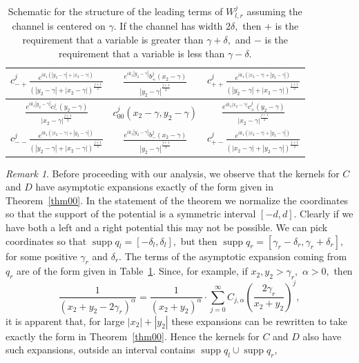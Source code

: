 \documentclass[11pt]{article}
\newcommand\supp{\operatorname{supp}}
\theoremstyle{definition}
\theoremstyle{remark}
\newtheorem{remark}{Remark}
\begin{document}
 \begin{table}[h]
   \begin{center}
  \begin{tabular}{c|c|c}
$c^j_{-+}\frac{e^{ik_1(|y_2-\gamma|+|x_2-\gamma|)}}{(|y_2-\gamma|+|x_2-\gamma|)^{\frac{j+1}{2}}}$ &
  $\frac{e^{ik_1|y_2-\gamma|}b^j_+(x_2-\gamma)}{|y_2-\gamma|^{\frac{j+1}{2}}}$ &
  $c^j_{++}\frac{e^{ik_1(|x_2-\gamma|+|y_2-\gamma|)}}{(|y_2-\gamma|+|x_2-\gamma|)^{\frac{j+1}{2}}}$\\
  \hline $\frac{e^{ik_1|y_2-\gamma|}c^j_-(y_2-\gamma)}{|x_2-\gamma|^{\frac{j+1}{2}}}$ & $c_{00}^j(x_2-\gamma,y_2-\gamma)$
  &$\frac{e^{ik_1|x_2-\gamma|}c^j_+(y_2-\gamma)}{|x_2-\gamma|^{\frac{j+1}{2}}}$ \\ \hline
  $c^j_{--}\frac{e^{ik_1(|x_2-\gamma|+|y_2-\gamma|)}}{(|y_2-\gamma|+|x_2-\gamma|)^{\frac{j+1}{2}}}$ &
  $\frac{e^{ik_1|y_2-\gamma|}b^j_-(x_2-\gamma)}{|y_2-\gamma|^{\frac{j+1}{2}}}$ &
  $c^j_{+-}\frac{e^{ik_1(|x_2-\gamma|+|y_2-\gamma|)}}{(|x_2-\gamma|+|y_2-\gamma|)^{\frac{j+1}{2}}}$
  \end{tabular}
  \end{center}
  \caption{Schematic for the structure of the leading terms of
    $W^j_{l,r}$ assuming the channel is centered on $\gamma.$ If the channel
    has width $2\delta,$ then $+$ is the requirement that a variable is greater than $\gamma+\delta,$ and
    $-$ is the requirement that a variable is less than $\gamma-\delta.$ }
  \label{tab1}
 \end{table}

 \begin{remark}\label{rmk10}
 Before proceeding with our analysis, we observe that the kernels for $C$ and
 $D$ have asymptotic expansions exactly of the form given in
 Theorem~\ref{thm00}. In the statement of the theorem we normalize the
 coordinates so that the support of the potential is a symmetric interval
 $[-d,d].$ Clearly if we have both a left and a right potential this may not be
 possible. We can pick coordinates so that $\supp q_l=[-\delta_l,\delta_l],$ but then $\supp
 q_r=[\gamma_r-\delta_r,\gamma_r+\delta_r],$ for some positive $\gamma_r$ and $\delta_r.$
 The terms of the asymptotic expansion coming from $q_r$ are of the form given
 in Table~\ref{tab1}. Since, for example, if $x_2,y_2>\gamma_r,$ $\alpha>0,$ then
 \begin{equation}
   \frac{1}{(x_2+y_2-2\gamma_r)^{\alpha}}=\frac{1}{(x_2+y_2)^{\alpha}}\cdot
   \sum_{j=0}^{\infty} C_{j,\alpha}\left(\frac{2\gamma_r}{x_2+y_2}\right)^j,
 \end{equation}
it is apparent that, for large $|x_2|+|y_2|$ these expansions can be rewritten
to take exactly the form in Theorem~\ref{thm00}.  Hence the kernels for $C$ and
$D$ also have such expansions, outside an interval contains $\supp q_l\cup\supp
q_r,$
 \end{remark}
 
\end{document}
